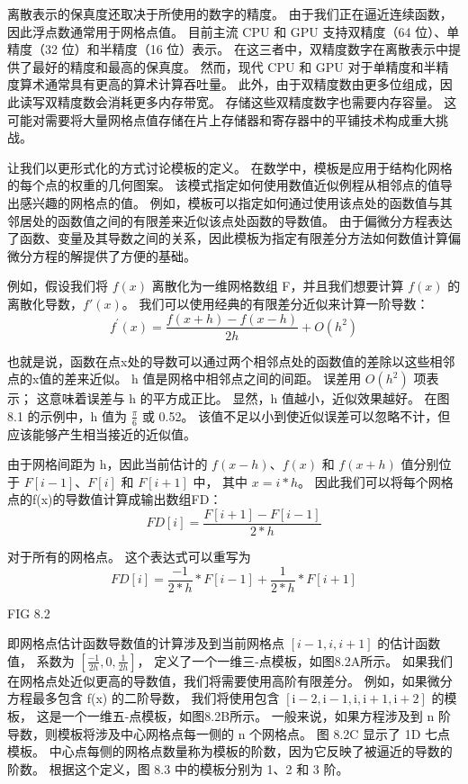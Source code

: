 离散表示的保真度还取决于所使用的数字的精度。 由于我们正在逼近连续函数，因此浮点数通常用于网格点值。 
目前主流 CPU 和 GPU 支持双精度（64 位）、单精度（32 位）和半精度（16 位）表示。 
在这三者中，双精度数字在离散表示中提供了最好的精度和最高的保真度。 
然而，现代 CPU 和 GPU 对于单精度和半精度算术通常具有更高的算术计算吞吐量。 
此外，由于双精度数由更多位组成，因此读写双精度数会消耗更多内存带宽。 存储这些双精度数字也需要内存容量。 
这可能对需要将大量网格点值存储在片上存储器和寄存器中的平铺技术构成重大挑战。

让我们以更形式化的方式讨论模板的定义。 在数学中，模板是应用于结构化网格的每个点的权重的几何图案。 
该模式指定如何使用数值近似例程从相邻点的值导出感兴趣的网格点的值。 
例如，模板可以指定如何通过使用该点处的函数值与其邻居处的函数值之间的有限差来近似该点处函数的导数值。 
由于偏微分方程表达了函数、变量及其导数之间的关系，因此模板为指定有限差分方法如何数值计算偏微分方程的解提供了方便的基础。

例如，假设我们将 $f(x)$ 离散化为一维网格数组 F，并且我们想要计算 $f(x)$ 的离散化导数，$f'(x)$。 
我们可以使用经典的有限差分近似来计算一阶导数：
$$
f^{\prime}(x)=\frac{f(x+h)-f(x-h)}{2 h}+O\left(h^{2}\right)
$$

也就是说，函数在点x处的导数可以通过两个相邻点处的函数值的差除以这些相邻点的x值的差来近似。 
h 值是网格中相邻点之间的间距。 误差用 $O(h^2)$ 项表示； 这意味着误差与 h 的平方成正比。 
显然，h 值越小，近似效果越好。 在图 8.1 的示例中，h 值为 $\frac{\pi}{6}$ 或 0.52。 
该值不足以小到使近似误差可以忽略不计，但应该能够产生相当接近的近似值。

由于网格间距为 h，因此当前估计的 $f(x - h)$、$f(x)$ 和 $f(x + h)$ 值分别位于 $F[i - 1]$、$F[i]$ 和 $F[i + 1]$ 中，
其中 $x=i*h$。 因此我们可以将每个网格点的f(x)的导数值计算成输出数组FD：
$$
F D[i]=\frac{F[i+1]-F[i-1]}{2 * h}
$$

对于所有的网格点。 这个表达式可以重写为
$$
F D[i]=\frac{-1}{2 * h} * F[i-1]+\frac{1}{2 * h} * F[i+1]
$$

{\color{red} FIG 8.2}

即网格点估计函数导数值的计算涉及到当前网格点 $[i - 1, i, i + 1]$ 的估计函数值，
系数为 $\left[\frac{-1}{2 h}, 0, \frac{1}{2 h}\right]$，
定义了一个一维三-点模板，如图8.2A所示。 如果我们在网格点处近似更高的导数值，我们将需要使用高阶有限差分。 
例如，如果微分方程最多包含 f(x) 的二阶导数，
我们将使用包含 $[\mathrm{i}-2, \mathrm{i}-1, \mathrm{i}, \mathrm{i}+1, \mathrm{i}+2]$ 的模板，
这是一个一维五-点模板，如图8.2B所示。 一般来说，如果方程涉及到 n 阶导数，则模板将涉及中心网格点每一侧的 n 个网格点。 
图 8.2C 显示了 1D 七点模板。 中心点每侧的网格点数量称为模板的阶数，因为它反映了被逼近的导数的阶数。 
根据这个定义，图 8.3 中的模板分别为 1、2 和 3 阶。

